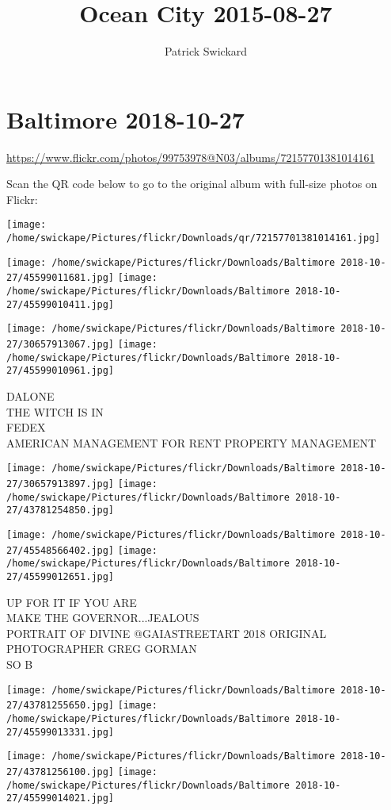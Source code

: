 \documentclass[10pt,letterpaper]{article}
\title{Ocean City 2015-08-27}
\author{Patrick Swickard}
\date{}
\begin{document}
\section*{Baltimore 2018-10-27}

\url{https://www.flickr.com/photos/99753978@N03/albums/72157701381014161}

Scan the QR code below to go to the original album with full-size photos on Flickr:

\texttt{[image: /home/swickape/Pictures/flickr/Downloads/qr/72157701381014161.jpg]}
\pagebreak

\texttt{[image: /home/swickape/Pictures/flickr/Downloads/Baltimore 2018-10-27/45599011681.jpg]}
\texttt{[image: /home/swickape/Pictures/flickr/Downloads/Baltimore 2018-10-27/45599010411.jpg]}

\texttt{[image: /home/swickape/Pictures/flickr/Downloads/Baltimore 2018-10-27/30657913067.jpg]}
\texttt{[image: /home/swickape/Pictures/flickr/Downloads/Baltimore 2018-10-27/45599010961.jpg]}

DALONE\\
THE WITCH IS IN\\
FEDEX\\
AMERICAN MANAGEMENT FOR RENT PROPERTY MANAGEMENT
\pagebreak

\texttt{[image: /home/swickape/Pictures/flickr/Downloads/Baltimore 2018-10-27/30657913897.jpg]}
\texttt{[image: /home/swickape/Pictures/flickr/Downloads/Baltimore 2018-10-27/43781254850.jpg]}

\texttt{[image: /home/swickape/Pictures/flickr/Downloads/Baltimore 2018-10-27/45548566402.jpg]}
\texttt{[image: /home/swickape/Pictures/flickr/Downloads/Baltimore 2018-10-27/45599012651.jpg]}

UP FOR IT IF YOU ARE\\
MAKE THE GOVERNOR...JEALOUS\\
PORTRAIT OF DIVINE @GAIASTREETART 2018 ORIGINAL PHOTOGRAPHER GREG GORMAN\\
SO B
\pagebreak

\texttt{[image: /home/swickape/Pictures/flickr/Downloads/Baltimore 2018-10-27/43781255650.jpg]}
\texttt{[image: /home/swickape/Pictures/flickr/Downloads/Baltimore 2018-10-27/45599013331.jpg]}

\texttt{[image: /home/swickape/Pictures/flickr/Downloads/Baltimore 2018-10-27/43781256100.jpg]}
\texttt{[image: /home/swickape/Pictures/flickr/Downloads/Baltimore 2018-10-27/45599014021.jpg]}
\end{document}
